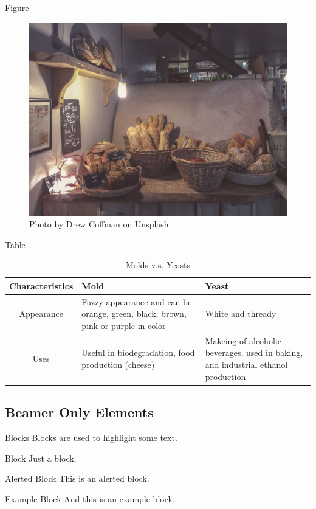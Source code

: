 \documentclass[10pt]{beamer}
\begin{document}
\begin{frame}{Figure}
  \begin{figure}
    \centering
    \includegraphics[width=.7\linewidth]{images/drew-coffman-Azli_kcxRNE-unsplash.jpg}
    \caption{Photo by Drew Coffman on Unsplash}
    \label{fig:breads-by-drew-coffman}
  \end{figure}
\end{frame}

\begin{frame}{Table}
  \begin{table}
    \centering
    \begin{tabularx}{\textwidth}{|c|X|X|}
      \hline
      \textbf{Characteristics} & \textbf{Mold} & \textbf{Yeast} \\ \hline\hline
      Appearance
      & Fuzzy appearance and can be orange, green, black, brown, pink or purple in color
      & White and thready \\ \hline
      Uses
      & Useful in biodegradation, food production (cheese)
      & Makeing of alcoholic beverages, used in baking, and industrial ethanol production \\ \hline
    \end{tabularx}
    \caption{Molds v.s. Yeasts}
    \label{tab:molds-vs-yeasts}
  \end{table}
\end{frame}

\subsection{Beamer Only Elements}

\begin{frame}{Blocks}
  Blocks are used to highlight some text.
  \begin{block}{Block}
    Just a block.
  \end{block}
  \begin{alertblock}{Alerted Block}
    This is an alerted block.
  \end{alertblock}
  \begin{exampleblock}{Example Block}
    And this is an example block.
  \end{exampleblock}
\end{frame}
\end{document}
